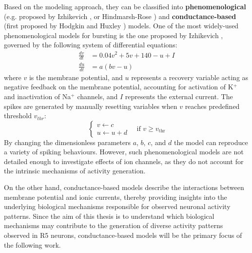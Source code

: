 \documentclass[../main.tex]{subfiles}
\begin{document}
Based on the modeling approach, they can be classified into \textbf{phenomenological} (e.g. proposed by Izhikevich \parencite{izhikevichSimpleModelSpiking2003,izhikevichNEURALEXCITABILITYSPIKING2000}, or Hindmarsh-Rose \parencite{wangGenesisBurstingOscillations1993}) and \textbf{conductance-based} (first proposed by Hodgkin and Huxley \parencite{hodgkinQuantitativeDescriptionMembrane1952}) models. One of the most widely-used phenomenological models for bursting is the one proposed by Izhikevich \parencite{izhikevichSimpleModelSpiking2003}, governed by the following system of differential equations:
\begin{align}
    \frac{dv}{dt}&=0.04 v^2 + 5v + 140 - u + I \label{eq:izhikevich_model_v} \\
    \frac{du}{dt}&=a(bv-u) \label{eq:izhikevich_model_u}
\end{align}
where $v$ is the membrane potential, and $u$ represents a recovery variable acting as negative feedback on the membrane potential, accounting for activation of K$^+$ and inactivation of Na$^+$ channels, and $I$ represents the external current. The spikes are generated by manually resetting variables when $v$ reaches predefined threshold $v_{thr}$:
\begin{equation*}
    \left\{
    \begin{array}{l}
    v \leftarrow c \\
    u \leftarrow u + d
    \end{array}
    \right.
    \quad \text{if } v \geq v_{\text{thr}}
\end{equation*}
By changing the dimensionless parameters $a$, $b$, $c$, and $d$ the model can reproduce a variety of spiking behaviours. However, such phenomenological models are not detailed enough to investigate effects of ion channels, as they do not account for the intrinsic mechanisms of activity generation.

On the other hand, conductance-based models describe the interactions between membrane potential and ionic currents, thereby providing insights into the underlying biological mechanisms responsible for observed neuronal activity patterns. Since the aim of this thesis is to understand which biological mechanisms may contribute to the generation of diverse activity patterns observed in R5 neurons, conductance-based models will be the primary focus of the following work.
\end{document}
